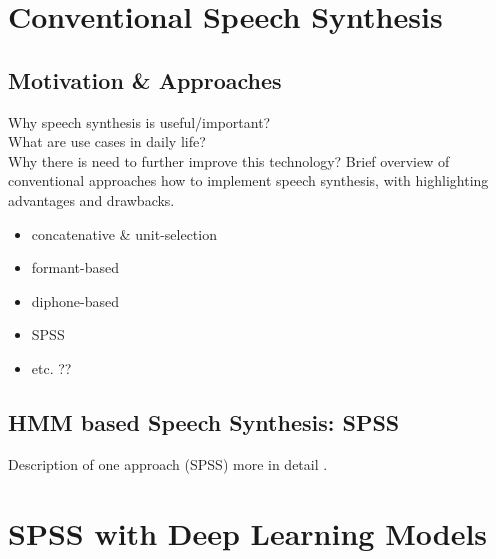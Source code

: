 

\section{Conventional Speech Synthesis}
\label{sec:speech}

\subsection{Motivation \& Approaches}
\label{subsec:convenspeech}

Why speech synthesis is useful/important?\\What are use cases in daily life?\\Why there is need to further improve this technology?
Brief overview of conventional approaches how to implement speech synthesis, with highlighting advantages and drawbacks.

\begin{itemize}[leftmargin=10pt]
	\item concatenative \& unit-selection
	\item formant-based
	\item diphone-based
	\item \ac{SPSS}
	\item etc. ??
\end{itemize}

\subsection{HMM based Speech Synthesis: \ac{SPSS}}
\label{subsec:hmmspeech}

Description of one approach (\ac{SPSS}) more in detail \cite{zen:statistical}.

\section{\ac{SPSS} with Deep Learning Models}
\label{sec:deepspeech}

